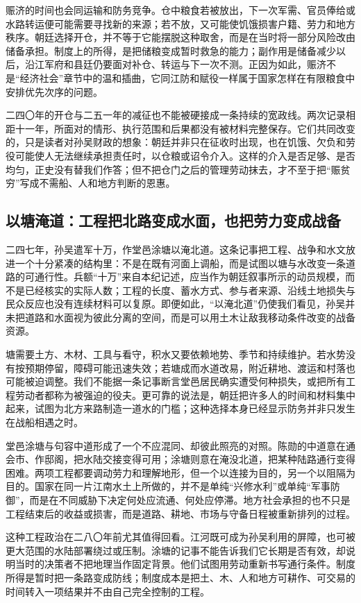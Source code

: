 赈济的时间也会同运输和防务竞争。仓中粮食若被放出，下一次军需、官员俸给或水路转运便可能需要寻找新的来源；若不放，又可能使饥饿损害户籍、劳力和地方秩序。朝廷选择开仓，并不等于它能摆脱这种取舍，而是在当时将一部分风险改由储备承担。制度上的所得，是把储粮变成暂时救急的能力；副作用是储备减少以后，沿江军府和县廷仍要面对补仓、转运与下一次不测。正因为如此，赈济不是“经济社会”章节中的温和插曲，它同江防和赋役一样属于国家怎样在有限粮食中安排优先次序的问题。

二四〇年的开仓与二五一年的减征也不能被硬接成一条持续的宽政线。两次记录相距十一年，所面对的情形、执行范围和后果都没有被材料完整保存。它们共同改变的，只是读者对孙吴财政的想象：朝廷并非只在征收时出现，也在饥饿、欠负和劳役可能使人无法继续承担责任时，以仓粮或诏令介入。这样的介入是否足够、是否均匀，正史没有替我们作答；但不把仓门之后的管理劳动抹去，才不至于把“赈贫穷”写成不需船、人和地方判断的恩惠。

\subsection{以塘淹道：工程把北路变成水面，也把劳力变成战备}
二四七年，孙吴遣军十万，作堂邑涂塘以淹北道。这条记事把工程、战争和水文放进一个十分紧凑的结构里：不是在既有河面上调船，而是试图以塘与水改变一条道路的可通行性。兵额“十万”来自本纪记述，应当作为朝廷叙事所示的动员规模，而不是已经核实的实际人数；工程的长度、蓄水方式、参与者来源、沿线土地损失与民众反应也没有连续材料可以复原。即便如此，“以淹北道”仍使我们看见，孙吴并未把道路和水面视为彼此分离的空间，而是可以用土木让敌我移动条件改变的战备资源。

塘需要土方、木材、工具与看守，积水又要依赖地势、季节和持续维护。若水势没有按预期停留，障碍可能迅速失效；若塘成而水道改易，附近耕地、渡运和村落也可能被迫调整。我们不能据一条记事断言堂邑居民确实遭受何种损失，或把所有工程劳动者都称为被强迫的役夫。更可靠的说法是，朝廷把许多人的时间和材料集中起来，试图为北方来路制造一道水的门槛；这种选择本身已经显示防务并非只发生在战船相遇之时。

堂邑涂塘与句容中道形成了一个不应混同、却彼此照亮的对照。陈勋的中道意在通会市、作邸阁，把水陆交接变得可用；涂塘则意在淹没北道，把某种陆路通行变得困难。两项工程都要调动劳力和理解地形，但一个以连接为目的，另一个以阻隔为目的。国家在同一片江南水土上所做的，并不是单纯“兴修水利”或单纯“军事防御”，而是在不同威胁下决定何处应流通、何处应停滞。地方社会承担的也不只是工程结束后的收益或损害，而是道路、耕地、市场与守备日程被重新排列的过程。

这种工程政治在二八〇年前尤其值得回看。江河既可成为孙吴利用的屏障，也可被更大范围的水陆部署绕过或压制。涂塘的记事不能告诉我们它长期是否有效，却说明当时的决策者不把地理当作固定背景。他们试图用劳动重新书写通行条件。制度所得是暂时把一条路变成防线；制度成本是把土、木、人和地方可耕作、可交易的时间转入一项结果并不由自己完全控制的工程。

